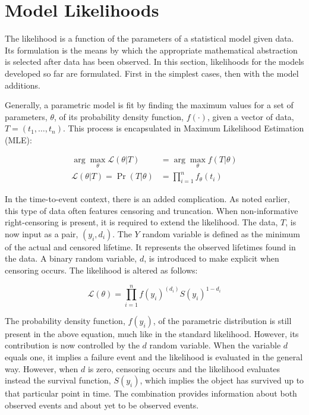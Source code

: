 \section*{Model Likelihoods}


The likelihood is a function of the parameters of a statistical model given data. Its formulation is the means by which the appropriate mathematical abstraction is selected after data has been observed. In this section, likelihoods for the models developed so far are formulated. First in the simplest cases, then with the model additions.

Generally, a parametric model is fit by finding the maximum values for a set of parameters, $\theta$, of its probability density function, $f(\cdot)$, given a vector of data, $T = (t_1, \dots, t_n)$. This process is encapsulated in Maximum Likelihood Estimation (MLE):

\begin{align*}
\displaystyle \arg \max _{\theta }{\mathcal {L}}(\theta | T) &= \arg \max _{\theta }f(T|\theta ) \\
{\mathcal {L}}(\theta | T) = \Pr(T | \theta) &= \prod_{i=1}^n f_{\theta}(t_i)
\end{align*}

In the time-to-event context, there is an added complication. As noted earlier, this type of data often features censoring and truncation. When non-informative right-censoring is present, it is required to extend the likelihood. The data, $T$, is now input as a pair, $(y_i, d_i)$. The $Y$ random variable is defined as the minimum of the actual and censored lifetime. It represents the observed lifetimes found in the data. A binary random variable, $d$, is introduced to make explicit when censoring occurs. The likelihood is altered as follows:

$$ \mathcal {L}(\theta) = \prod^n_{i=1} f(y_i)^{(d_i)} S(y_i)^{1 - d_i} $$

The probability density function, $f(y_i)$, of the parametric distribution is still present in the above equation, much like in the standard likelihood. However, its contribution is now controlled by the $d$ random variable. When the variable $d$ equals one, it implies a failure event and the likelihood is evaluated in the general way. However, when $d$ is zero,  censoring occurs and the likelihood evaluates instead the survival function, $S(y_i)$, which implies the object has survived up to that particular point in time. The combination provides information about both observed events and about yet to be observed events. 

